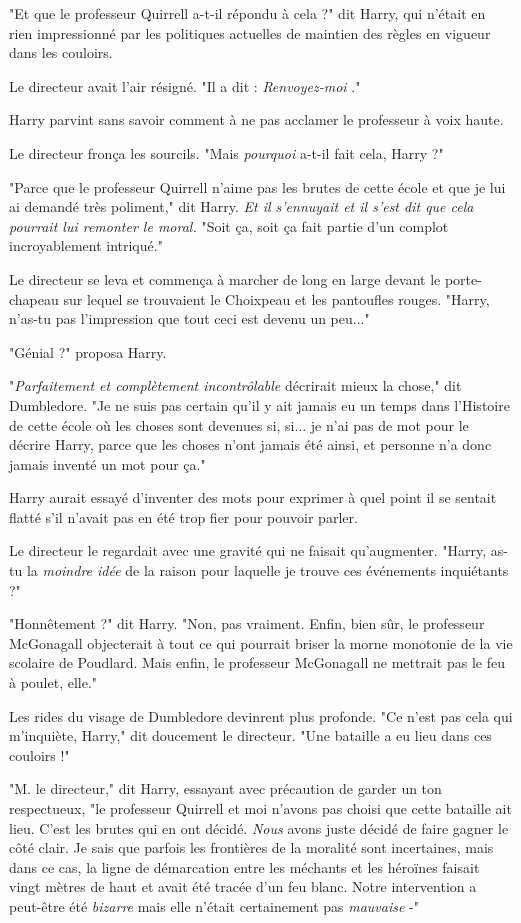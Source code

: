 "Et que le professeur Quirrell a-t-il répondu à cela ?" dit Harry, qui n'était en rien impressionné par les politiques actuelles de maintien des règles en vigueur dans les couloirs.

Le directeur avait l'air résigné. "Il a dit : \emph{Renvoyez-moi} ."

Harry parvint sans savoir comment à ne pas acclamer le professeur à voix haute.

Le directeur fronça les sourcils. "Mais \emph{pourquoi}  a-t-il fait cela, Harry ?"

"Parce que le professeur Quirrell n'aime pas les brutes de cette école et que je lui ai demandé très poliment," dit Harry. \emph{Et il s'ennuyait et il s'est dit que cela pourrait lui remonter le moral.}  "Soit ça, soit ça fait partie d'un complot incroyablement intriqué."

Le directeur se leva et commença à marcher de long en large devant le porte-chapeau sur lequel se trouvaient le Choixpeau et les pantoufles rouges. "Harry, n'as-tu pas l'impression que tout ceci est devenu un peu..."

"Génial ?" proposa Harry.

"\emph{Parfaitement et complètement incontrôlable}  décrirait mieux la chose," dit Dumbledore. "Je ne suis pas certain qu'il y ait jamais eu un temps dans l'Histoire de cette école où les choses sont devenues si, si... je n'ai pas de mot pour le décrire Harry, parce que les choses n'ont jamais été ainsi, et personne n'a donc jamais inventé un mot pour ça."

Harry aurait essayé d'inventer des mots pour exprimer à quel point il se sentait flatté s'il n'avait pas en été trop fier pour pouvoir parler.

Le directeur le regardait avec une gravité qui ne faisait qu'augmenter. "Harry, as-tu la \emph{moindre idée}  de la raison pour laquelle je trouve ces événements inquiétants ?"

"Honnêtement ?" dit Harry. "Non, pas vraiment. Enfin, bien sûr, le professeur McGonagall objecterait à tout ce qui pourrait briser la morne monotonie de la vie scolaire de Poudlard. Mais enfin, le professeur McGonagall ne mettrait pas le feu à poulet, elle."

Les rides du visage de Dumbledore devinrent plus profonde. "Ce n'est pas cela qui m'inquiète, Harry," dit doucement le directeur. "Une bataille a eu lieu dans ces couloirs !"

"M. le directeur," dit Harry, essayant avec précaution de garder un ton respectueux, "le professeur Quirrell et moi n'avons pas choisi que cette bataille ait lieu. C'est les brutes qui en ont décidé. \emph{Nous}  avons juste décidé de faire gagner le côté clair. Je sais que parfois les frontières de la moralité sont incertaines, mais dans ce cas, la ligne de démarcation entre les méchants et les héroïnes faisait vingt mètres de haut et avait été tracée d'un feu blanc. Notre intervention a peut-être été \emph{bizarre}  mais elle n'était certainement pas \emph{mauvaise}  -"

